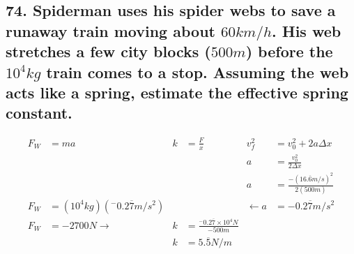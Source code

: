\documentclass[12pt,a4paper,english]{article}
\begin{document}
\begin{flushleft}
  \subsection{74. Spiderman uses his spider webs to save a runaway train moving about $60km/h$. His web stretches a few city blocks ($500 m$) before the $10^4kg$ train comes to a stop. Assuming the web acts like a spring, estimate the effective spring constant.}
  \begin{align*}
    F_W&=ma
       &
    k&=\frac{F}{x}
     &
     v_f^2&=v_0^2+2a\Delta x
    \\
          &&&&a&=\frac{v^2_0}{2\Delta x}
          \\
          &&&&a&=\frac{-(16.\overline{6}m/s)^2}{2(500m)}
          \\
     F_W&=(10^4kg)(^-0.2\overline{7}m/s^2)
        &&&\leftarrow a&=-0.2\overline{7}m/s^2
          \\
     F_W&=-2700N\rightarrow
        &
     k&=\frac{^-0.2\overline{7}\times10^4N}{-500m}
     \\
      &&
     k&=5.\overline{5}N/m
  \end{align*}
\end{flushleft}
\end{document}
